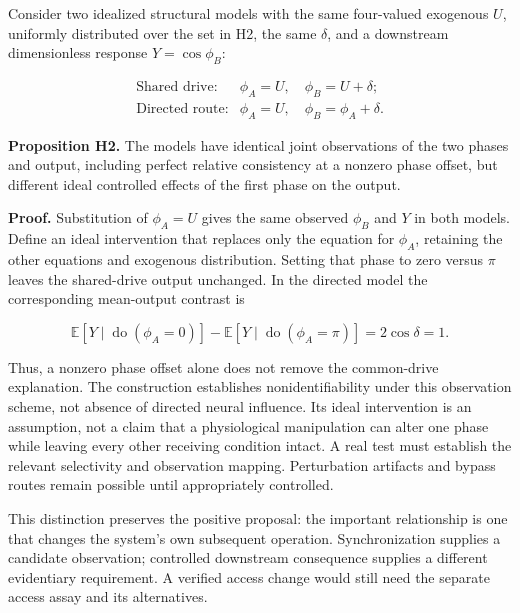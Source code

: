 \documentclass[
  american,
  11pt,
  letterpaper,
]{article}
\begin{document}
Consider two idealized structural models with the same four-valued exogenous \(U\), uniformly distributed over the set in H2, the same \(\delta\), and a downstream dimensionless response \(Y=\cos\phi_B\):

\begin{equation}
\begin{array}{ll}
\text{Shared drive:}&\phi_A=U,\quad\phi_B=U+\delta;\\
\text{Directed route:}&\phi_A=U,\quad\phi_B=\phi_A+\delta.
\end{array}\tag{H3}
\end{equation}

\textbf{Proposition H2.} The models have identical joint observations of the two phases and output, including perfect relative consistency at a nonzero phase offset, but different ideal controlled effects of the first phase on the output.

\textbf{Proof.} Substitution of \(\phi_A=U\) gives the same observed \(\phi_B\) and \(Y\) in both models. Define an ideal intervention that replaces only the equation for \(\phi_A\), retaining the other equations and exogenous distribution. Setting that phase to zero versus \(\pi\) leaves the shared-drive output unchanged. In the directed model the corresponding mean-output contrast is

\begin{equation}
\mathbb E[Y\mid\operatorname{do}(\phi_A=0)]-
\mathbb E[Y\mid\operatorname{do}(\phi_A=\pi)]
=2\cos\delta=1.
\tag{H4}
\end{equation}

Thus, a nonzero phase offset alone does not remove the common-drive explanation. The construction establishes nonidentifiability under this observation scheme, not absence of directed neural influence. Its ideal intervention is an assumption, not a claim that a physiological manipulation can alter one phase while leaving every other receiving condition intact. A real test must establish the relevant selectivity and observation mapping. Perturbation artifacts and bypass routes remain possible until appropriately controlled.

This distinction preserves the positive proposal: the important relationship is one that changes the system's own subsequent operation. Synchronization supplies a candidate observation; controlled downstream consequence supplies a different evidentiary requirement. A verified access change would still need the separate access assay and its alternatives.
\end{document}
